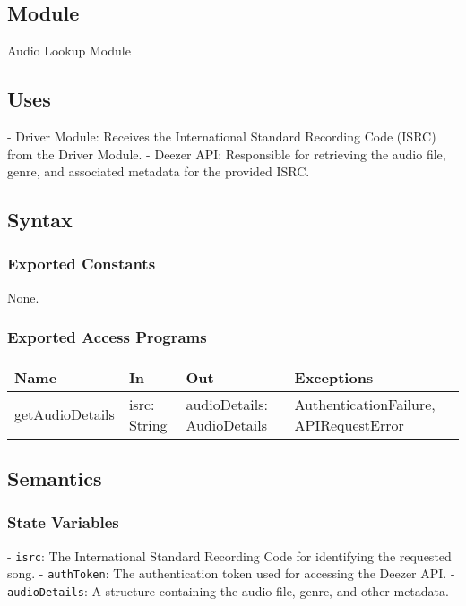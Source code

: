 \documentclass[12pt, titlepage]{article}
\begin{document}
\subsection{Module}
Audio Lookup Module

\subsection{Uses}
- Driver Module: Receives the International Standard Recording Code (ISRC) from the Driver Module.
- Deezer API: Responsible for retrieving the audio file, genre, and associated metadata for the provided ISRC.

\subsection{Syntax}

\subsubsection{Exported Constants}
None.

\subsubsection{Exported Access Programs}

\begin{center}
\begin{tabular}{p{2cm} p{4cm} p{4cm} p{2cm}}
\hline
\textbf{Name} & \textbf{In} & \textbf{Out} & \textbf{Exceptions} \\
\hline
getAudioDetails & isrc: String & audioDetails: AudioDetails & AuthenticationFailure, APIRequestError \\
\hline
\end{tabular}
\end{center}

\subsection{Semantics}

\subsubsection{State Variables}
- \texttt{isrc}: The International Standard Recording Code for identifying the requested song.
- \texttt{authToken}: The authentication token used for accessing the Deezer API.
- \texttt{audioDetails}: A structure containing the audio file, genre, and other metadata.
\end{document}
